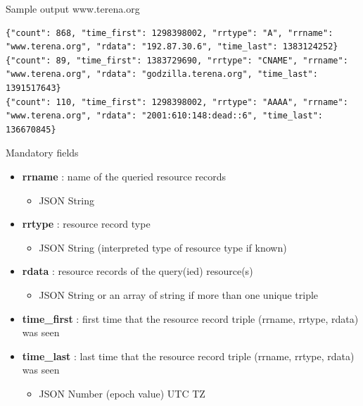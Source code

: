 \documentclass{beamer}
\begin{document}
\begin{frame}[t,fragile]{Sample output www.terena.org}

\lstset{breaklines=true, language=JavaScript}
\begin{lstlisting}
{"count": 868, "time_first": 1298398002, "rrtype": "A", "rrname": "www.terena.org", "rdata": "192.87.30.6", "time_last": 1383124252}
{"count": 89, "time_first": 1383729690, "rrtype": "CNAME", "rrname": "www.terena.org", "rdata": "godzilla.terena.org", "time_last": 1391517643}
{"count": 110, "time_first": 1298398002, "rrtype": "AAAA", "rrname": "www.terena.org", "rdata": "2001:610:148:dead::6", "time_last": 136670845}
\end{lstlisting}
\end{frame}


\begin{frame}[t]{Mandatory fields}
\begin{itemize}
\item \textbf{rrname} : name of the queried resource records
\begin{itemize}
\item JSON String
\end{itemize}
\item \textbf{rrtype} : resource record type
\begin{itemize}
\item JSON String (interpreted type of resource type if known)
\end{itemize}
\item \textbf{rdata} : resource records of the query(ied) resource(s)
\begin{itemize}
\item JSON String or an array of string if more than one unique triple
\end{itemize}
\item \textbf{time\_first} : first time that the resource record triple (rrname, rrtype, rdata) was seen
\item \textbf{time\_last} : last time that the resource record triple (rrname, rrtype, rdata) was seen
\begin{itemize}
\item JSON Number (epoch value) UTC TZ
\end{itemize}
\end{itemize}
\end{frame}
\end{document}
